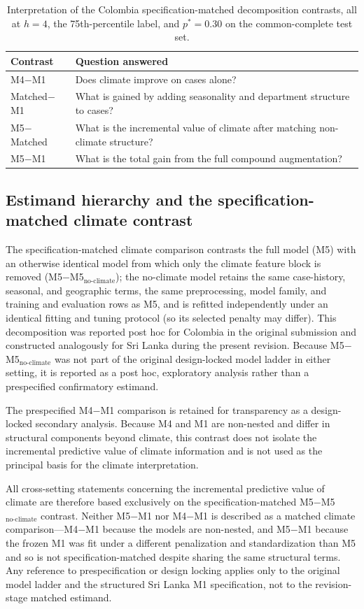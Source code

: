\documentclass[11pt,a4paper]{article}
\begin{document}
\begin{table}[H]
\centering
\caption{Interpretation of the Colombia specification-matched decomposition contrasts, all at $h=4$, the 75th-percentile label, and $p^*=0.30$ on the common-complete test set.}
\label{tab:contrastq}
\begin{tabular}{ll}
\toprule
Contrast & Question answered \\
\midrule
M4$-$M1 & Does climate improve on cases alone? \\
Matched$-$M1 & What is gained by adding seasonality and department structure to cases? \\
M5$-$Matched & What is the incremental value of climate after matching non-climate structure? \\
M5$-$M1 & What is the total gain from the full compound augmentation? \\
\bottomrule
\end{tabular}
\end{table}


\subsection{Estimand hierarchy and the specification-matched climate contrast}
The specification-matched climate comparison contrasts the full model (M5) with an otherwise identical model from which only the climate feature block is removed (M5$-$M5$_{\text{no-climate}}$); the no-climate model retains the same case-history, seasonal, and geographic terms, the same preprocessing, model family, and training and evaluation rows as M5, and is refitted independently under an identical fitting and tuning protocol (so its selected penalty may differ). This decomposition was reported post hoc for Colombia in the original submission and constructed analogously for Sri Lanka during the present revision. Because M5$-$M5$_{\text{no-climate}}$ was not part of the original design-locked model ladder in either setting, it is reported as a post hoc, exploratory analysis rather than a prespecified confirmatory estimand.

The prespecified M4$-$M1 comparison is retained for transparency as a design-locked secondary analysis. Because M4 and M1 are non-nested and differ in structural components beyond climate, this contrast does not isolate the incremental predictive value of climate information and is not used as the principal basis for the climate interpretation.

All cross-setting statements concerning the incremental predictive value of climate are therefore based exclusively on the specification-matched M5$-$M5$_{\text{no-climate}}$ contrast. Neither M5$-$M1 nor M4$-$M1 is described as a matched climate comparison---M4$-$M1 because the models are non-nested, and M5$-$M1 because the frozen M1 was fit under a different penalization and standardization than M5 and so is not specification-matched despite sharing the same structural terms. Any reference to prespecification or design locking applies only to the original model ladder and the structured Sri Lanka M1 specification, not to the revision-stage matched estimand.
\end{document}
